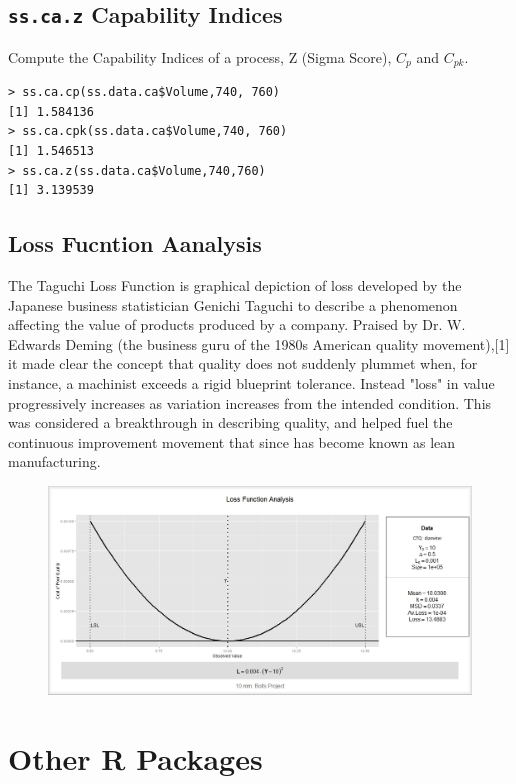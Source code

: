 \documentclass[]{report}
\begin{document}
\subsection{\texttt{ss.ca.z} Capability Indices}

Compute the Capability Indices of a process, Z (Sigma Score), $C_p$ and $C_{pk}$.
\begin{verbatim}
> ss.ca.cp(ss.data.ca$Volume,740, 760)
[1] 1.584136
> ss.ca.cpk(ss.data.ca$Volume,740, 760)
[1] 1.546513
> ss.ca.z(ss.data.ca$Volume,740,760)
[1] 3.139539
\end{verbatim}



\newpage
\newpage
\subsection{Loss Fucntion Aanalysis}
The Taguchi Loss Function is graphical depiction of loss developed by the Japanese business statistician Genichi Taguchi to describe a phenomenon affecting the value of products produced by a company. Praised by Dr. W. Edwards Deming (the business guru of the 1980s American quality movement),[1] it made clear the concept that quality does not suddenly plummet when, for instance, a machinist exceeds a rigid blueprint tolerance. Instead "loss" in value progressively increases as variation increases from the intended condition. This was considered a breakthrough in describing quality, and helped fuel the continuous improvement movement that since has become known as lean manufacturing.

\begin{figure}[h!]
\centering
\includegraphics[width=0.7\linewidth]{images/LossFunctionAnalysis}
\caption{}
\label{fig:LossFunctionAnalysis}
\end{figure}
\newpage
\section{Other R Packages}
\end{document}
